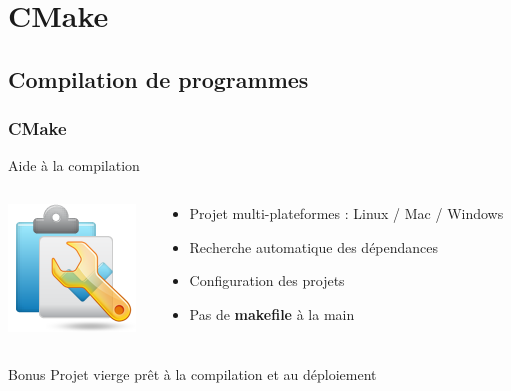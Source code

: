 \documentclass{beamer}
\begin{document}

\section{CMake}
\subsection*{Compilation de programmes}

\begin{frame}[label=cmake]
  \frametitle{CMake}
  
    \begin{block}{Aide à la compilation}
    \begin{columns}
      \begin{column}{0.2\linewidth}
        \includegraphics[width=1\linewidth]{images/compiler.png}
      \end{column}
      \hspace{-15mm}
      \begin{column}{0.7\linewidth}
        \begin{itemize}
        \item Projet multi-plateformes :\linebreak
        Linux / Mac / Windows
        \item Recherche automatique des dépendances
        \item Configuration des projets
        \item Pas de \textbf{makefile} à la main
        \end{itemize}
      \end{column}
      \end{columns}
	\end{block}

    \begin{exampleblock}{Bonus}
    Projet vierge prêt à la compilation et au déploiement
    \end{exampleblock}
\end{frame}
\end{document}
